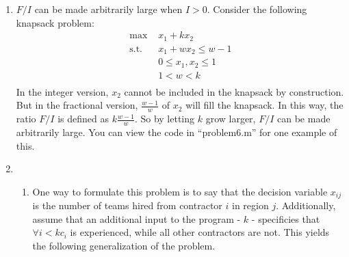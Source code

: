 \documentclass[12pt]{article}
\begin{document}
\begin{enumerate}
\begin{lstlisting}
      [xmax, fmax, status, extra] = ...
        glpk(c, A, b, lb, ub, ctype, vartype, sense);
      disp(xmax);
    \end{lstlisting}
    Which gives the solution $x_3 = 1;x_5 = 1;x_1,x_2,x_4 = 0$.\\

    In the fractional version, one way to reach the optimal is to fill the
    knapsack with as much as possible of $x_i$, going in decreasing order of
    the profit-to-weight ratios of each $x_i$. In the integer version, this
    cannot be used as the strategy, because there is the possibility that the
    last item added to the knapsack will not completely fit, which would result
    in lost value from the unused capacity. So, the integer solution appears to
    choose higher absolute value that exactly fill the knapsack ($x_3$ and $x_5$,
    in this case) over higher values normalized by weight.
  \item
    $F/I$ can be made arbitrarily large when $I > 0$. Consider the following
    knapsack problem:\\
    \begin{equation}
      \begin{split}
      \text{max }& x_1 + kx_2 \\
      \text{s.t. }& x_1 + wx_2\leq w - 1 \\
      & 0\leq x_1,x_2\leq 1 \\
      & 1 < w < k \\
      \end{split}
    \end{equation}
    In the integer version, $x_2$ cannot be included in the knapsack by
    construction. But in the fractional version, $\frac{w-1}{w}$ of $x_2$ will
    fill the knapsack. In this way, the ratio $F/I$ is defined as $k\frac{w-1}{w}$.
    So by letting $k$ grow larger, $F/I$ can be made arbitrarily large. You can
    view the code in ``problem6.m'' for one example of this.
  \item
    \begin{enumerate}
      \item
        One way to formulate this problem is to say that the decision variable
        $x_{ij}$ is the number of teams hired from contractor $i$ in region $j$.
        Additionally, assume that an additional input to the program - $k$ -
        specificies that $\forall i<k c_i$ is experienced, while all other
        contractors are not. This yields the following generalization of the problem.\\

\end{enumerate}
\end{enumerate}
\end{document}
